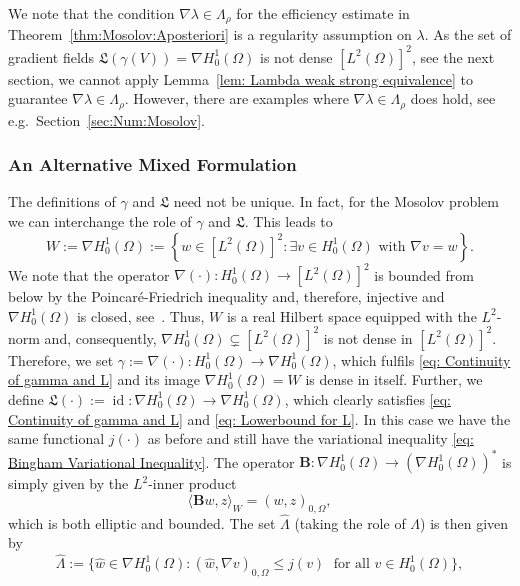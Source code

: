 \documentclass[12pt,twoside,reqno]{amsart}
\theoremstyle{definition}
\numberwithin{equation}{section}
\renewcommand{\L}{\mathfrak{L}}
\newcommand{\B} {\bm{B}}
\begin{document}
            
                We note that the condition $\nabla\lambda\in\Lambda_\rho$ for the efficiency estimate  in Theorem~\ref{thm:Mosolov:Aposteriori} is a regularity assumption on $\lambda$. As the set of gradient fields $\L(\gamma(V))=\nabla H^1_0(\Omega)$ is not dense $[L^2(\Omega)]^2$, see the next section, we cannot apply Lemma~\ref{lem: Lambda weak strong equivalence} to guarantee $\nabla\lambda\in\Lambda_\rho$. However, there are examples where $\nabla\lambda\in\Lambda_\rho$ does hold, see e.g.~Section~\ref{sec:Num:Mosolov}.


 \subsubsection{An Alternative Mixed Formulation}
 The definitions of $\gamma$ and $\L$ need not be unique. In fact,  for the Mosolov problem we can interchange the role of $\gamma$ and $\L$. This leads to
$$ W:=\nabla H^1_0(\Omega) :=\left\{ w \in [L^2(\Omega)]^2: \exists v \in H^1_0(\Omega) \text{ with } \nabla v = w \right\}. $$
We note that the operator $\nabla(\cdot):H^1_0(\Omega)\to [L^2(\Omega)]^2$ is bounded from below by the Poincar\'e-Friedrich inequality and, therefore, injective and $\nabla H^1_0(\Omega)$ is closed, see~\cite[Thm.~2.5]{Abramovich2002}. Thus, $W$ is a real Hilbert space equipped with the $L^2$-norm and, consequently, $\nabla H^1_0(\Omega) \subsetneq [L^2(\Omega)]^2$ is not dense in $[L^2(\Omega)]^2$. Therefore, we set $\gamma:=\nabla(\cdot):H^1_0(\Omega)\to\nabla H^1_0(\Omega)$, which fulfils \eqref{eq: Continuity of gamma and L} and its image $\nabla H^1_0(\Omega)=W$ is dense in itself. Further, we define $\L(\cdot):=\operatorname{id}:\nabla H^1_0(\Omega)\to \nabla H^1_0(\Omega)$, which clearly satisfies \eqref{eq: Continuity of gamma and L} and \eqref{eq: Lowerbound for L}.
        In this case we have the same functional $j(\cdot)$ as before and still have the variational inequality \eqref{eq: Bingham Variational Inequality}. The operator $\B:\nabla H^1_0(\Omega)\to (\nabla H^1_0(\Omega))^*$ is simply given by the $L^2$-inner product
        \begin{equation*}
            \langle \B w,z\rangle_W = (w,z)_{0,\Omega},
        \end{equation*}
        which is both elliptic and bounded. The set $\hat\Lambda$ (taking the role of $\Lambda$) is then given by
        \begin{equation*}
           \hat \Lambda:=\{\hat{w}\in\nabla H^1_0(\Omega): (\hat{w},\nabla v)_{0,\Omega}\leq j(v)\;\text{ for all } v\in  H^1_0(\Omega)\},
        \end{equation*}
\end{document}
